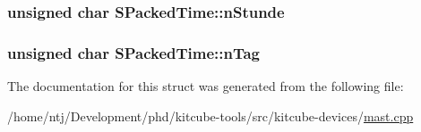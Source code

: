 \hypertarget{structSPackedTime_afdc796655d7edf2c8b37b3b7dc15e0d3}{
\subsubsection[{n\-Stunde}]{\setlength{\rightskip}{0pt plus 5cm}unsigned char S\-Packed\-Time\-::n\-Stunde}}\label{structSPackedTime_afdc796655d7edf2c8b37b3b7dc15e0d3}
\hypertarget{structSPackedTime_a8e166cec833b233faf6064f59979265c}{
\subsubsection[{n\-Tag}]{\setlength{\rightskip}{0pt plus 5cm}unsigned char S\-Packed\-Time\-::n\-Tag}}\label{structSPackedTime_a8e166cec833b233faf6064f59979265c}


The documentation for this struct was generated from the following file\-:\begin{DoxyCompactItemize}
\item 
/home/ntj/\-Development/phd/kitcube-\/tools/src/kitcube-\/devices/\hyperlink{mast_8cpp}{mast.\-cpp}\end{DoxyCompactItemize}
